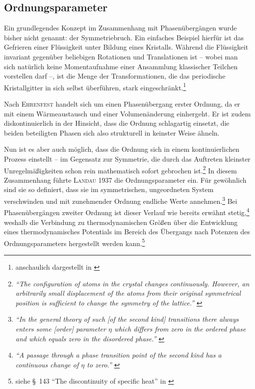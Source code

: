 \documentclass[a4paper, 10pt, twoside, openany]{book} %
\begin{document}
\subsection{Ordnungsparameter}

Ein grundlegendes Konzept im Zusammenhang mit Phasenübergängen wurde bisher nicht genannt: der Symmetriebruch. Ein einfaches Beispiel hierfür ist das Gefrieren einer Flüssigkeit unter Bildung eines Kristalls. Während die Flüssigkeit invariant gegenüber beliebigen Rotationen und Translationen ist -- wobei man sich natürlich keine Momentaufnahme einer Ansammlung klassischer Teilchen vorstellen darf --, ist die Menge der Transformationen, die das periodische Kristallgitter in sich selbst überführen, stark eingeschränkt.\footnote{anschaulich dargestellt in \cite[S.~2]{Sethna}}

Nach \textsc{Ehrenfest} handelt sich um einen Phasenübergang erster Ordnung, da er mit einem Wärmeaustausch und einer Volumenänderung einhergeht. Er ist zudem diskontinuierlich in der Hinsicht, dass die Ordnung schlagartig einsetzt, die beiden beteiligten Phasen sich also strukturell in keinster Weise ähneln.

Nun ist es aber auch möglich, dass die Ordnung sich in einem kontinuierlichen Prozess einstellt -- im Gegensatz zur Symmetrie, die durch das Auftreten kleinster Unregelmäßigkeiten schon rein mathematisch sofort gebrochen ist.\footnote{\emph{"`The configuration of atoms in the crystal changes continuously. However, an arbitrarily small displacement of the atoms from their original symmetrical position is sufficient to change the symmetry of the lattice."'} \cite[S.~447]{Landau2}} In diesem Zusammenhang führte \textsc{Landau} 1937 die Ordnungsparameter ein. Für gewöhnlich sind sie so definiert, dass sie im symmetrischen, ungeordneten System verschwinden und mit zunehmender Ordnung endliche Werte annehmen.\footnote{\emph{"`In the general theory of such \emph{[of the second kind]} transitions there always enters some \emph{[order]} parameter $\eta$ which differs from zero in the ordered phase and which equals zero in the disordered phase."'} \cite[S.~546]{Landau1}} Bei Phasenübergängen zweiter Ordnung ist dieser Verlauf wie bereits erwähnt stetig,\footnote{\emph{"`A passage through a phase transition point of the second kind has a continuous change of $\eta$ to zero."'} \cite[S.~450]{Landau2}} weshalb die Verbindung zu thermodynamischen Größen über die Entwicklung eines thermodynamisches Potentials im Bereich des Übergangs nach Potenzen des Ordnungsparameters hergestellt werden kann.\footnote{siehe \S~143 "`The discontinuity of specific heat"' in \cite[S.~451ff]{Landau2}}
\end{document}
